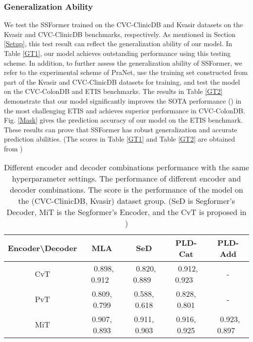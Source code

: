 \documentclass[runningheads]{llncs}
\begin{document}
\subsubsection{Generalization Ability}
We test the SSFormer trained on the CVC-ClinicDB and Kvasir datasets on the Kvasir and CVC-ClinicDB benchmarks, respectively. As mentioned in Section \ref{Setup}, this test result can reflect the generalization ability of our model. In Table \ref{GT1}, our model achieves outstanding performance using this testing scheme. In addition, to further assess the generalization ability of SSFormer, we refer to the experimental scheme of PraNet, use the training set constructed from part of the Kvasir and CVC-ClinicDB datasets for training, and test the model on the CVC-ColonDB and ETIS benchmarks. The results in Table \ref{GT2} demonstrate that our model significantly improves the SOTA performance () in the most challenging ETIS and achieves superior performance in CVC-ColonDB. Fig. \ref{Mask} gives the prediction accuracy of our model on the ETIS benchmark. These results can prove that SSFormer has robust generalization and accurate prediction abilities. (The scores in Table \ref{GT1} and Table \ref{GT2} are obtained from \cite{UACAnet,u-net,srivastava2021msrf,unet++})




\begin{table}[h]\scriptsize
\centering
\caption{Different encoder and decoder combinations performance with the same hyperparameter settings. The performance of different encoder and decoder combinations. The score is the performance of the model on the (CVC-ClinicDB, Kvasir) dataset group. (SeD is Segformer's Decoder, MiT is the Segformer's Encoder, and the CvT is proposed in \cite{cvt})}
\label{AS2}
\renewcommand\arraystretch{1.3}
\begin{tabular}{|c|c|c|c|c|}
\hline
\multicolumn{1}{|l|}{Encoder\textbackslash{}Decoder} & MLA\cite{zheng2021rethinking}          & SeD\cite{xie2021segformer}          & PLD-Cat      & PLD-Add      \\ \hline
CvT\cite{cvt}                                                  &  ~0.898, 0.912~  &  ~0.820, 0.889~  &  ~0.912, 0.923~  & -            \\ \hline
PvT\cite{pvtv1}                                                  &  0.809, 0.799  &  0.588, 0.618  &  0.828, 0.801  & -            \\ \hline
MiT\cite{xie2021segformer}                                                  &  0.907, 0.893  &  0.911, 0.903  &  0.916, 0.925  &  ~0.923, 0.897~  \\ \hline
\end{tabular}
\end{table}
\end{document}
